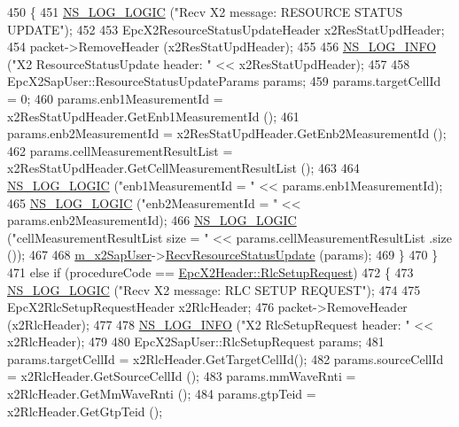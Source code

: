 \begin{DoxyCode}
450         \{
451           \hyperlink{group__logging_ga88acd260151caf2db9c0fc84997f45ce}{NS\_LOG\_LOGIC} (\textcolor{stringliteral}{"Recv X2 message: RESOURCE STATUS UPDATE"});
452 
453           EpcX2ResourceStatusUpdateHeader x2ResStatUpdHeader;
454           packet->RemoveHeader (x2ResStatUpdHeader);
455 
456           \hyperlink{group__logging_gafbd73ee2cf9f26b319f49086d8e860fb}{NS\_LOG\_INFO} (\textcolor{stringliteral}{"X2 ResourceStatusUpdate header: "} << x2ResStatUpdHeader);
457 
458           EpcX2SapUser::ResourceStatusUpdateParams params;
459           params.targetCellId = 0;
460           params.enb1MeasurementId = x2ResStatUpdHeader.GetEnb1MeasurementId ();
461           params.enb2MeasurementId = x2ResStatUpdHeader.GetEnb2MeasurementId ();
462           params.cellMeasurementResultList = x2ResStatUpdHeader.GetCellMeasurementResultList ();
463 
464           \hyperlink{group__logging_ga88acd260151caf2db9c0fc84997f45ce}{NS\_LOG\_LOGIC} (\textcolor{stringliteral}{"enb1MeasurementId = "} << params.enb1MeasurementId);
465           \hyperlink{group__logging_ga88acd260151caf2db9c0fc84997f45ce}{NS\_LOG\_LOGIC} (\textcolor{stringliteral}{"enb2MeasurementId = "} << params.enb2MeasurementId);
466           \hyperlink{group__logging_ga88acd260151caf2db9c0fc84997f45ce}{NS\_LOG\_LOGIC} (\textcolor{stringliteral}{"cellMeasurementResultList size = "} << params.cellMeasurementResultList
      .size ());
467 
468           \hyperlink{classns3_1_1EpcX2_a0a74a3c19067fe18af3021c7b4c24c19}{m\_x2SapUser}->\hyperlink{classns3_1_1EpcX2SapUser_a7d0fa47a75bd24b12f15f4b5a1c7b253}{RecvResourceStatusUpdate} (params);
469         \}
470     \}
471   \textcolor{keywordflow}{else} \textcolor{keywordflow}{if} (procedureCode == \hyperlink{classns3_1_1EpcX2Header_afd178c1ed3c47948c587955698a15b0daa1fc9674b00b57cf95b53ef94f00db86}{EpcX2Header::RlcSetupRequest})
472     \{
473       \hyperlink{group__logging_ga88acd260151caf2db9c0fc84997f45ce}{NS\_LOG\_LOGIC} (\textcolor{stringliteral}{"Recv X2 message: RLC SETUP REQUEST"});
474 
475       EpcX2RlcSetupRequestHeader x2RlcHeader;
476       packet->RemoveHeader (x2RlcHeader);
477 
478       \hyperlink{group__logging_gafbd73ee2cf9f26b319f49086d8e860fb}{NS\_LOG\_INFO} (\textcolor{stringliteral}{"X2 RlcSetupRequest header: "} << x2RlcHeader);
479 
480       EpcX2SapUser::RlcSetupRequest params;
481       params.targetCellId = x2RlcHeader.GetTargetCellId();
482       params.sourceCellId = x2RlcHeader.GetSourceCellId ();
483       params.mmWaveRnti = x2RlcHeader.GetMmWaveRnti ();
484       params.gtpTeid = x2RlcHeader.GetGtpTeid ();

\end{DoxyCode}
